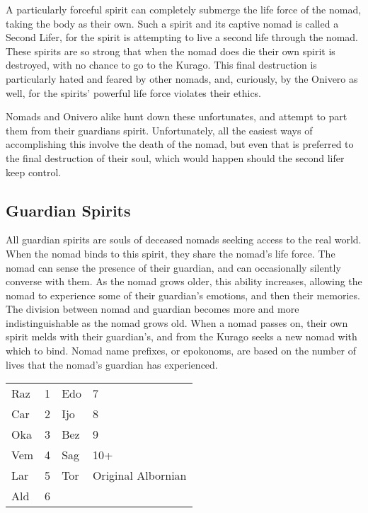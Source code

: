 \begin{multicols*}{2}
A particularly forceful spirit can completely submerge the life force of the nomad, taking the body as their own. Such a spirit and its captive nomad is called a Second Lifer, for the spirit is attempting to live a second life through the nomad. These spirits are so strong that when the nomad does die their own spirit is destroyed, with no chance to go to the Kurago. This final destruction is particularly hated and feared by other nomads, and, curiously, by the Onivero as well, for the spirits' powerful life force violates their ethics.

Nomads and Onivero alike hunt down these unfortunates, and attempt to part them from their guardians spirit. Unfortunately, all the easiest ways of accomplishing this involve the death of the nomad, but even that is preferred to the final destruction of their soul, which would happen should the second lifer keep control.


\subsection{Guardian Spirits}

All guardian spirits are souls of deceased nomads seeking access to the real world. When the nomad binds to this spirit, they share the nomad's life force. The nomad can sense the presence of their guardian, and can occasionally silently converse with them. As the nomad grows older, this ability increases, allowing the nomad to experience some of their guardian's emotions, and then their memories. The division between nomad and guardian becomes more and more indistinguishable as the nomad grows old. When a nomad passes on, their own spirit melds with their guardian's, and from the Kurago seeks a new nomad with which to bind. Nomad name prefixes, or epokonoms, are based on the number of lives that the nomad's guardian has experienced.

\begin{normbox}
\small
\begin{tabular}{@{}l l l l}
Raz &1&Edo &7\\
Car &2&Ijo &8\\
Oka &3&Bez &9\\
Vem &4&Sag & 10+\\
Lar &5&Tor & Original Albornian\\
Ald &6&&\\
\end{tabular}
\end{normbox}


\end{multicols*}
